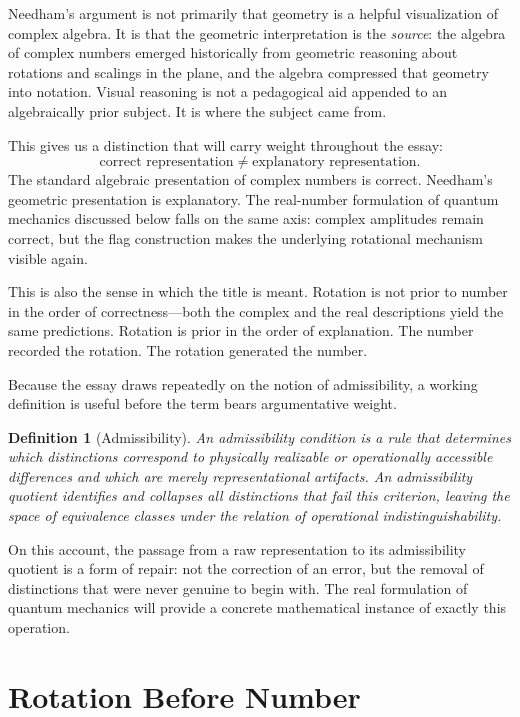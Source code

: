 \documentclass[12pt]{article}
\newtheorem{definition}[theorem]{Definition}
\begin{document}
Needham's argument is not primarily that geometry is a helpful visualization of complex algebra. It is that the geometric interpretation is the \emph{source}: the algebra of complex numbers emerged historically from geometric reasoning about rotations and scalings in the plane, and the algebra compressed that geometry into notation. Visual reasoning is not a pedagogical aid appended to an algebraically prior subject. It is where the subject came from.

This gives us a distinction that will carry weight throughout the essay:
\[
\text{correct representation}
\;\neq\;
\text{explanatory representation.}
\]
The standard algebraic presentation of complex numbers is correct. Needham's geometric presentation is explanatory. The real-number formulation of quantum mechanics discussed below falls on the same axis: complex amplitudes remain correct, but the flag construction makes the underlying rotational mechanism visible again.

This is also the sense in which the title is meant. Rotation is not prior to number in the order of correctness---both the complex and the real descriptions yield the same predictions. Rotation is prior in the order of explanation. The number recorded the rotation. The rotation generated the number.

Because the essay draws repeatedly on the notion of admissibility, a working definition is useful before the term bears argumentative weight.

\begin{definition}[Admissibility]
An \emph{admissibility condition} is a rule that determines which distinctions correspond to physically realizable or operationally accessible differences and which are merely representational artifacts. An \emph{admissibility quotient} identifies and collapses all distinctions that fail this criterion, leaving the space of equivalence classes under the relation of operational indistinguishability.
\end{definition}

On this account, the passage from a raw representation to its admissibility quotient is a form of repair: not the correction of an error, but the removal of distinctions that were never genuine to begin with. The real formulation of quantum mechanics will provide a concrete mathematical instance of exactly this operation.

\section{Rotation Before Number}
\end{document}
